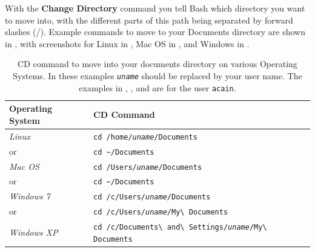 With the \textbf{Change Directory} command you tell Bash which directory you want to move into, with the different parts of this path being separated by forward slashes (/). Example commands to move to your Documents directory are shown in , with screenshots for Linux in , Mac OS in , and Windows in .

\begin{table}[h]
  \centering
  \begin{tabular}{|l|l|}
  \hline
  \textbf{Operating System} & \textbf{CD Command}  \\
  \hline
  \emph{Linux} & \texttt{cd /home/\emph{uname}/Documents} \\
  or & \texttt{cd \textasciitilde/Documents} \\
  \hline
  \emph{Mac OS} & \texttt{cd /Users/\emph{uname}/Documents} \\
  or & \texttt{cd \textasciitilde/Documents} \\
  \hline
  \emph{Windows 7} & \texttt{cd /c/Users/\emph{uname}/Documents} \\
  or & \texttt{cd /c/Users/\emph{uname}/My{\textbackslash} Documents} \\
  \hline
  \emph{Windows XP} & \texttt{cd /c/Documents{\textbackslash} and{\textbackslash} Settings/\emph{uname}/My{\textbackslash} Documents} \\
  \hline
\end{tabular}
  \caption{CD command to move into your documents directory on various Operating Systems. In these examples \texttt{\emph{uname}} should be replaced by your user name. The examples in , , and  are for the user \texttt{acain}.}
  \label{tbl:dirs}
\end{table}


